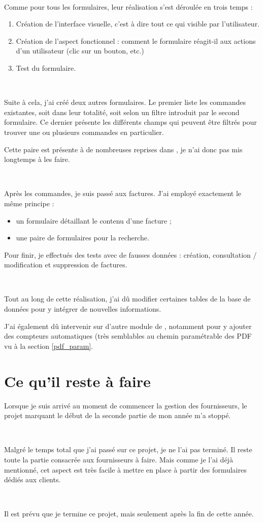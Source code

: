 ~

Comme pour tous les formulaires, leur réalisation s'est déroulée en trois temps :
\begin{enumerate}
	\item Création de l'interface visuelle, c'est à dire tout ce qui visible par l'utilisateur.
	\item Création de l'aspect fonctionnel : comment le formulaire réagit-il aux actions d'un utilisateur (clic sur un bouton, etc.)
	\item Test du formulaire.
\end{enumerate}

~

Suite à cela, j'ai créé deux autres formulaires. Le premier liste les commandes existantes, soit dans leur totalité, soit selon un filtre introduit par le second formulaire. Ce dernier présente les différents champs qui peuvent être filtrés pour trouver une ou plusieurs commandes en particulier.

Cette paire est présente à de nombreuses reprises dans \integrale, je n'ai donc pas mis longtemps à les faire.

~

Après les commandes, je suis passé aux factures. J'ai employé exactement le même principe :
\begin{itemize}
	\item un formulaire détaillant le contenu d'une facture ;
	\item une paire de formulaires pour la recherche.
\end{itemize}

Pour finir, je effectués des tests avec de fausses données : création, consultation / modification et suppression de factures.

~

Tout au long de cette réalisation, j'ai dû modifier certaines tables de la base de données pour y intégrer de nouvelles informations.

J'ai également dû intervenir sur d'autre module de \integrale, notamment pour y ajouter des compteurs automatiques (très semblables au chemin paramétrable des PDF vu à la section \ref{pdf_param}.

\section{Ce qu'il reste à faire}
Lorsque je suis arrivé au moment de commencer la gestion des fournisseurs, le projet marquant le début de la seconde partie de mon année m'a stoppé.

~

Malgré le temps total que j'ai passé sur ce projet, je ne l'ai pas terminé. Il reste toute la partie consacrée aux fournisseurs à faire. Mais comme je l'ai déjà mentionné, cet aspect est très facile à mettre en place à partir des formulaires dédiés aux clients.

~

Il est prévu que je termine ce projet, mais seulement après la fin de cette année.

